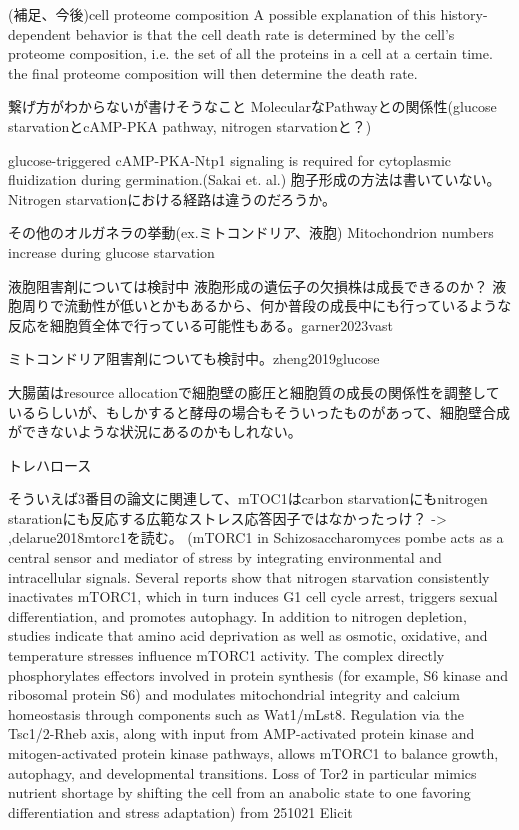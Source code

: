 (補足、今後)cell proteome composition
A possible explanation of this history-dependent behavior is that the cell death rate is determined by the cell’s proteome composition, i.e. the set of all the proteins in a cell at a certain time.
the final proteome composition will then determine the death rate.



繋げ方がわからないが書けそうなこと
MolecularなPathwayとの関係性(glucose starvationとcAMP-PKA pathway, nitrogen starvationと？)

glucose-triggered cAMP-PKA-Ntp1 signaling is required for cytoplasmic fluidization during germination.(Sakai et. al.)
胞子形成の方法は書いていない。Nitrogen starvationにおける経路は違うのだろうか。


その他のオルガネラの挙動(ex.ミトコンドリア、液胞)
Mitochondrion numbers increase during glucose starvation

液胞阻害剤については検討中
液胞形成の遺伝子の欠損株は成長できるのか？
液胞周りで流動性が低いとかもあるから、何か普段の成長中にも行っているような反応を細胞質全体で行っている可能性もある。garner2023vast

ミトコンドリア阻害剤についても検討中。zheng2019glucose

大腸菌はresource allocationで細胞壁の膨圧と細胞質の成長の関係性を調整しているらしいが、もしかすると酵母の場合もそういったものがあって、細胞壁合成ができないような状況にあるのかもしれない。

トレハロース

そういえば3番目の論文に関連して、mTOC1はcarbon starvationにもnitrogen starationにも反応する広範なストレス応答因子ではなかったっけ？ -> ,delarue2018mtorc1を読む。
(mTORC1 in Schizosaccharomyces pombe acts as a central sensor and mediator of stress by integrating environmental and intracellular signals. Several reports show that nitrogen starvation consistently inactivates mTORC1, which in turn induces G1 cell cycle arrest, triggers sexual differentiation, and promotes autophagy. In addition to nitrogen depletion, studies indicate that amino acid deprivation as well as osmotic, oxidative, and temperature stresses influence mTORC1 activity.
The complex directly phosphorylates effectors involved in protein synthesis (for example, S6 kinase and ribosomal protein S6) and modulates mitochondrial integrity and calcium homeostasis through components such as Wat1/mLst8. Regulation via the Tsc1/2-Rheb axis, along with input from AMP-activated protein kinase and mitogen-activated protein kinase pathways, allows mTORC1 to balance growth, autophagy, and developmental transitions. Loss of Tor2 in particular mimics nutrient shortage by shifting the cell from an anabolic state to one favoring differentiation and stress adaptation) from 251021 Elicit

